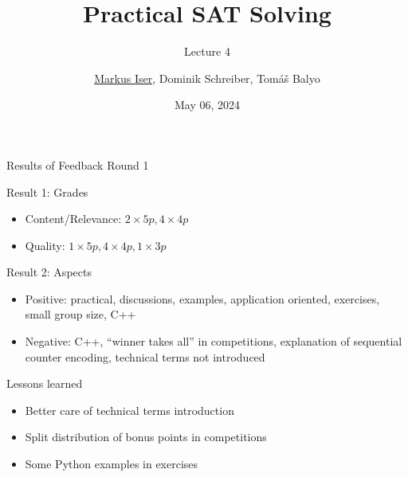 \documentclass[t]{sdqbeamer}
\title[SAT Solving]{Practical SAT Solving}
\subtitle{Lecture 4}
\author{\underline{Markus Iser}, Dominik Schreiber, Tom\'a\v{s} Balyo}
\date{May 06, 2024}
\begin{document}
\begin{frame}
	\thispagestyle{empty}
	\titlepage
\end{frame}


\begin{frame}{Results of Feedback Round 1}
\begin{block}{Result 1: Grades}
\begin{itemize}\setlength{\itemsep}{1ex}
    \item Content/Relevance: $2 \times 5p, 4 \times 4p$
    \item Quality: $1 \times 5p, 4 \times 4p, 1 \times 3p$
\end{itemize}
\end{block}
\begin{block}{Result 2: Aspects}
\begin{itemize}\setlength{\itemsep}{1ex}
    \item Positive: practical, discussions, examples, application oriented, exercises, small group size, C++
    \item Negative: C++, ``winner takes all'' in competitions, explanation of sequential counter encoding, technical terms not introduced
\end{itemize}
\end{block}
\begin{block}{Lessons learned}
\begin{itemize}\setlength{\itemsep}{1ex}
    \item Better care of technical terms introduction
    \item Split distribution of bonus points in competitions
    \item Some Python examples in exercises
\end{itemize}
\end{block}
\end{frame}
\end{document}
